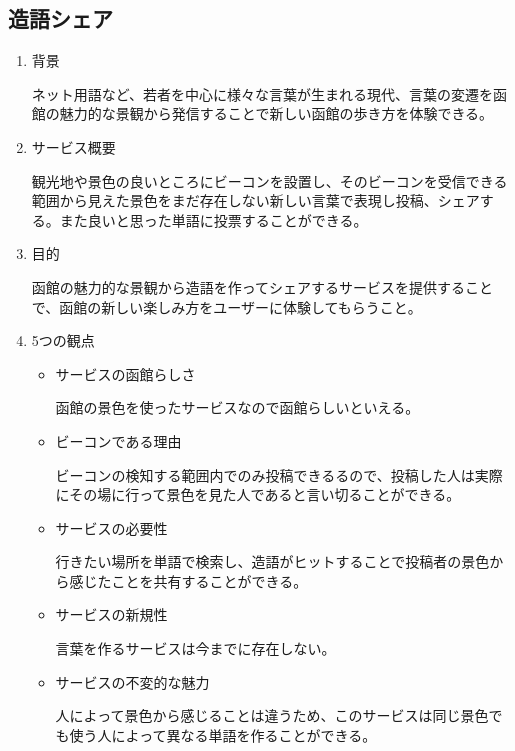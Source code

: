 \subsection{造語シェア}
\begin{enumerate}
    \item 背景
    \par ネット用語など、若者を中心に様々な言葉が生まれる現代、言葉の変遷を函館の魅力的な景観から発信することで新しい函館の歩き方を体験できる。
    \item サービス概要
    \par 観光地や景色の良いところにビーコンを設置し、そのビーコンを受信できる範囲から見えた景色をまだ存在しない新しい言葉で表現し投稿、シェアする。また良いと思った単語に投票することができる。
    \item 目的
    \par 函館の魅力的な景観から造語を作ってシェアするサービスを提供することで、函館の新しい楽しみ方をユーザーに体験してもらうこと。
    \item 5つの観点
    \begin{itemize}
        \item サービスの函館らしさ
        \par 函館の景色を使ったサービスなので函館らしいといえる。
        \item ビーコンである理由
        \par ビーコンの検知する範囲内でのみ投稿できるるので、投稿した人は実際にその場に行って景色を見た人であると言い切ることができる。
        \item サービスの必要性
        \par 行きたい場所を単語で検索し、造語がヒットすることで投稿者の景色から感じたことを共有することができる。
        \item サービスの新規性
        \par 言葉を作るサービスは今までに存在しない。
        \item サービスの不変的な魅力
        \par 人によって景色から感じることは違うため、このサービスは同じ景色でも使う人によって異なる単語を作ることができる。
    \end{itemize}
\end{enumerate}

